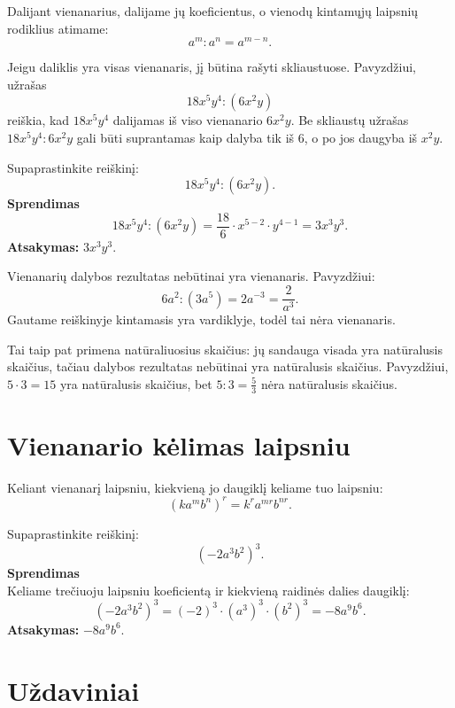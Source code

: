 \documentclass[11pt,a4paper]{scrartcl}
\begin{document}
\begin{property}
Dalijant vienanarius, dalijame jų koeficientus, o vienodų kintamųjų laipsnių rodiklius atimame:
\[
a^m:a^n=a^{m-n}.
\]
\end{property}

Jeigu daliklis yra visas vienanaris, jį būtina rašyti skliaustuose. Pavyzdžiui, užrašas
\[
18x^5y^4:(6x^2y)
\]
reiškia, kad $18x^5y^4$ dalijamas iš viso vienanario $6x^2y$. Be skliaustų užrašas $18x^5y^4:6x^2y$ gali būti suprantamas kaip dalyba tik iš $6$, o po jos daugyba iš $x^2y$.

\begin{example}
Supaprastinkite reiškinį:
\[
18x^5y^4:(6x^2y).
\]
\textbf{Sprendimas}\\
\[
18x^5y^4:(6x^2y)=\frac{18}{6}\cdot x^{5-2}\cdot y^{4-1}=3x^3y^3.
\]
\textbf{Atsakymas:} $3x^3y^3$.
\end{example}

\begin{remark}
Vienanarių dalybos rezultatas nebūtinai yra vienanaris. Pavyzdžiui:
\[
6a^2:(3a^5)=2a^{-3}=\frac{2}{a^3}.
\]
Gautame reiškinyje kintamasis yra vardiklyje, todėl tai nėra vienanaris.

Tai taip pat primena natūraliuosius skaičius: jų sandauga visada yra natūralusis skaičius, tačiau dalybos rezultatas nebūtinai yra natūralusis skaičius. Pavyzdžiui, $5\cdot 3=15$ yra natūralusis skaičius, bet $5:3=\frac{5}{3}$ nėra natūralusis skaičius.
\end{remark}

\section{Vienanario kėlimas laipsniu}

\begin{property}
Keliant vienanarį laipsniu, kiekvieną jo daugiklį keliame tuo laipsniu:
\[
(ka^mb^n)^r=k^ra^{mr}b^{nr}.
\]
\end{property}

\begin{example}
Supaprastinkite reiškinį:
\[
(-2a^3b^2)^3.
\]
\textbf{Sprendimas}\\
Keliame trečiuoju laipsniu koeficientą ir kiekvieną raidinės dalies daugiklį:
\[
(-2a^3b^2)^3=(-2)^3\cdot(a^3)^3\cdot(b^2)^3=-8a^9b^6.
\]
\textbf{Atsakymas:} $-8a^9b^6$.
\end{example}

\section{Uždaviniai}
\end{document}
